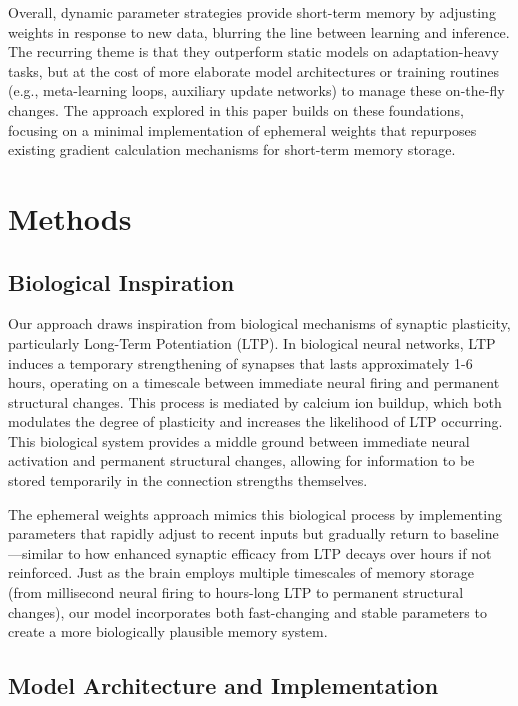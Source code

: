 \documentclass{article} %
\begin{document}
Overall, dynamic parameter strategies provide short-term memory by adjusting weights in response to new data, blurring the line between learning and inference. The recurring theme is that they outperform static models on adaptation-heavy tasks, but at the cost of more elaborate model architectures or training routines (e.g., meta-learning loops, auxiliary update networks) to manage these on-the-fly changes. The approach explored in this paper builds on these foundations, focusing on a minimal implementation of ephemeral weights that repurposes existing gradient calculation mechanisms for short-term memory storage.

\section{Methods}

\subsection{Biological Inspiration}

Our approach draws inspiration from biological mechanisms of synaptic plasticity, particularly Long-Term Potentiation (LTP). In biological neural networks, LTP induces a temporary strengthening of synapses that lasts approximately 1-6 hours, operating on a timescale between immediate neural firing and permanent structural changes. This process is mediated by calcium ion buildup, which both modulates the degree of plasticity and increases the likelihood of LTP occurring. This biological system provides a middle ground between immediate neural activation and permanent structural changes, allowing for information to be stored temporarily in the connection strengths themselves.

The ephemeral weights approach mimics this biological process by implementing parameters that rapidly adjust to recent inputs but gradually return to baseline—similar to how enhanced synaptic efficacy from LTP decays over hours if not reinforced. Just as the brain employs multiple timescales of memory storage (from millisecond neural firing to hours-long LTP to permanent structural changes), our model incorporates both fast-changing and stable parameters to create a more biologically plausible memory system.

\subsection{Model Architecture and Implementation}
\end{document}
